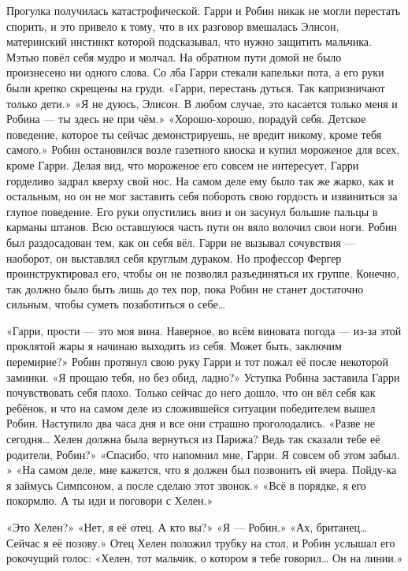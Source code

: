 \documentclass[a4paper,12pt]{book}
\begin{document}
	Прогулка получилась катастрофической. Гарри и Робин никак не могли перестать спорить, и это привело к тому, что в их разговор вмешалась Элисон, материнский инстинкт которой подсказывал, что нужно защитить мальчика. Мэтью повёл себя мудро и молчал. 
	На обратном пути домой не было произнесено ни одного слова. Со лба Гарри стекали капельки пота, а его руки были крепко скрещены на груди.
	«Гарри, перестань дуться. Так капризничают только дети.»
	«Я не дуюсь, Элисон. В любом случае, это касается только меня и Робина — ты здесь не при чём.»
	«Хорошо-хорошо, порадуй себя. Детское поведение, которое ты сейчас демонстрируешь, не вредит никому, кроме тебя самого.»
	 Робин остановился возле газетного киоска и купил мороженое для всех, кроме Гарри. Делая вид, что мороженое его совсем не интересует, Гарри горделиво задрал кверху свой нос. На самом деле ему было так же жарко, как и остальным, но он не мог заставить себя побороть свою гордость и извиниться за глупое поведение. Его руки опустились вниз и он засунул большие пальцы в карманы штанов. Всю оставшуюся часть пути он вяло волочил свои ноги.
	Робин был раздосадован тем, как он себя вёл. Гарри не вызывал сочувствия — наоборот, он выставлял себя круглым дураком. Но профессор Фергер проинструктировал его, чтобы он не позволял разъединяться их группе. Конечно, так должно было быть лишь до тех пор, пока Робин не станет достаточно сильным, чтобы суметь позаботиться о себе…

	«Гарри, прости — это моя вина. Наверное, во всём виновата погода — из-за этой проклятой жары я начинаю выходить из себя. Может быть, заключим перемирие?»
	Робин протянул свою руку Гарри и тот пожал её после некоторой заминки.
	«Я прощаю тебя, но без обид, ладно?»
	Уступка Робина заставила Гарри почувствовать себя плохо. Только сейчас до него дошло, что он вёл себя как ребёнок, и что на самом деле из сложившейся ситуации победителем вышел Робин.
	Наступило два часа дня и все они страшно проголодались.
	«Разве не сегодня… Хелен должна была вернуться из Парижа? Ведь так сказали тебе её родители, Робин?»
	«Спасибо, что напомнил мне, Гарри. Я совсем об этом забыл. »
	«На самом деле, мне кажется, что я должен был позвонить ей вчера. Пойду-ка я займусь Симпсоном, а после сделаю этот звонок.»
	«Всё в порядке, я его покормлю. А ты иди и поговори с Хелен.»

	«Это Хелен?»
	«Нет, я её отец. А кто вы?»
	«Я — Робин.»
	«Ах, британец… Сейчас я её позову.»
	Отец Хелен положил трубку на стол, и Робин услышал его рокочущий голос:
	«Хелен, тот мальчик, о котором я тебе говорил… Он на линии.»
\end{document}
